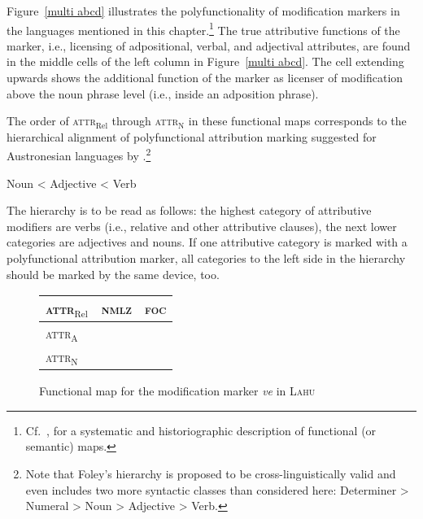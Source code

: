 Figure~\ref{multi abcd} illustrates the polyfunctionality of modification markers in the languages mentioned in this chapter.\footnote{Cf.~\cite{haspelmath2003}, for a systematic and historiographic description of functional (or semantic) maps.} The true attributive functions of the marker, i.e., licensing of adpositional, verbal, and adjectival attributes, are found in the middle cells of the left column in Figure~\ref{multi abcd}. The cell extending upwards shows the additional function of the marker as licenser of modification above the noun phrase level (i.e., inside an adposition phrase).%

The order of \textsc{attr}$_{\text{Rel}}$ through \textsc{attr}$_{\text{N}}$ in these functional maps corresponds to the hierarchical alignment of polyfunctional attribution marking suggested for Austronesian languages by \textcite{foley1980}.\footnote{Note that Foley's hierarchy is proposed to be cross-linguistically valid and even includes two more syntactic classes than considered here: Determiner > Numeral > Noun > Adjective > Verb.}
\begin{exe}
\ex	Noun < Adjective < Verb
\end{exe}
The hierarchy is to be read as follows: the highest category of attributive modifiers are verbs (i.e., relative and other attributive clauses), the next lower categories are adjectives and nouns. If one attributive category is marked with a polyfunctional attribution marker, all categories to the left side in the hierarchy should be marked by the same device, too.

\begin{figure}
\parbox[b]{\textwidth}{
\begin{center}
\begin{tabular}{| l || c | c |}
\cline{1-1}
\\
\hline
\textsc{attr}$_{\text{Rel}}$ & \textsc{nmlz} & \textsc{foc}\\
\hline
\textsc{attr}$_{\text{A}}$\\
\cline{1-1}
\textsc{attr}$_{\text{N}}$\\
\cline{1-1}
\end{tabular}
\end{center}
}
\caption[Functional map for modification marking]{Functional map for the modification marker \textit{ve} in \textsc{Lahu}}
\label{lahu funcmap}
\end{figure}

